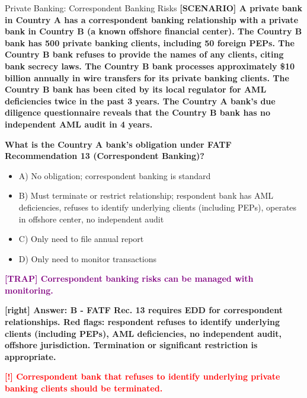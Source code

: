 \documentclass[11pt,a4paper]{beamer}
\newcommand{\redflag}[1]{\textcolor{red}{\textbf{[!] #1}}}
\newcommand{\trap}[1]{\textcolor{purple}{\textbf{[TRAP] #1}}}
\newcommand{\correct}[1]{\textcolor{green!50!black}{\textbf{[right] #1}}}
\newcommand{\scenario}[1]{\textcolor{blue!70!black}{\textbf{[SCENARIO] #1}}}
\begin{document}
	
	\begin{frame}{Private Banking: Correspondent Banking Risks}
		\tiny
		\scenario{A private bank in Country A has a correspondent banking relationship with a private bank in Country B (a known offshore financial center). The Country B bank has 500 private banking clients, including 50 foreign PEPs. The Country B bank refuses to provide the names of any clients, citing bank secrecy laws. The Country B bank processes approximately \$10 billion annually in wire transfers for its private banking clients. The Country B bank has been cited by its local regulator for AML deficiencies twice in the past 3 years. The Country A bank's due diligence questionnaire reveals that the Country B bank has no independent AML audit in 4 years.}
		
		\vspace{0.02cm}
		\textbf{What is the Country A bank's obligation under FATF Recommendation 13 (Correspondent Banking)?}
		\vspace{0.02cm}
		
		\begin{itemize}
			\item A) No obligation; correspondent banking is standard
			\item B) Must terminate or restrict relationship; respondent bank has AML deficiencies, refuses to identify underlying clients (including PEPs), operates in offshore center, no independent audit
			\item C) Only need to file annual report
			\item D) Only need to monitor transactions
		\end{itemize}
		
		\vspace{0.02cm}
		\trap{Correspondent banking risks can be managed with monitoring.}
		
		\vspace{0.02cm}
		\correct{Answer: B - FATF Rec. 13 requires EDD for correspondent relationships. Red flags: respondent refuses to identify underlying clients (including PEPs), AML deficiencies, no independent audit, offshore jurisdiction. Termination or significant restriction is appropriate.}
		
		\vspace{0.02cm}
		\redflag{Correspondent bank that refuses to identify underlying private banking clients should be terminated.}
	\end{frame}
	
\end{document}
